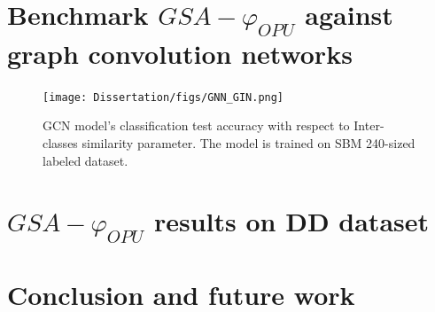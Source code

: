 \section{Benchmark $GSA-\varphi_{OPU}$ against graph convolution networks}
\begin{figure}[H]
\centering
\texttt{[image: Dissertation/figs/GNN\_GIN.png]}
\caption[GCN model's classification test accuracy as a function of Inter-classes similarity parameter ]{GCN model's classification test accuracy with respect to Inter-classes similarity parameter. The  model is trained on SBM 240-sized labeled dataset.}
\label{fig:GCN_GIN_SBM_multfactor_RW}
\end{figure}

\section{$GSA-\varphi_{OPU}$ results on DD dataset}
\section{Conclusion and future work}





